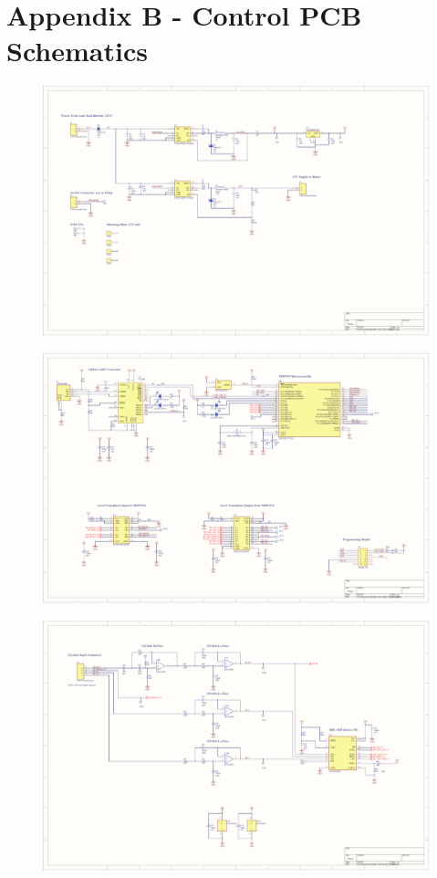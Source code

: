 \documentclass[oneside,final,a4paper]{report}
\begin{document}
\chapter*{Appendix B - Control PCB Schematics}
\begin{figure}[hbt]
 \centering
 \includegraphics[scale=0.4, angle=270]{FYDP_Schematic_Sheet_1}
\end{figure}
\begin{figure}[hbt]
 \centering
 \includegraphics[scale=0.4, angle=270]{FYDP_Schematic_Sheet_2}
\end{figure}
\begin{figure}[hbt]
 \centering
 \includegraphics[scale=0.4, angle=270]{FYDP_Schematic_Sheet_3}
\end{figure}
\end{document}
